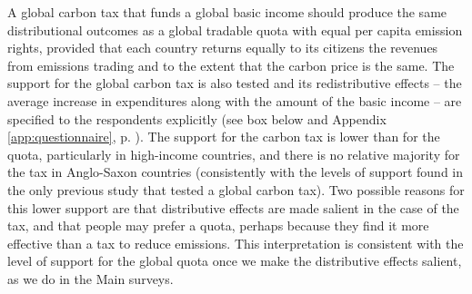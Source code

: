 A global carbon tax that funds a global basic income should produce the same distributional outcomes as a global tradable quota with equal per capita emission rights, provided that each country returns equally to its citizens the revenues from emissions trading and to the extent that the carbon price is the same. %
The support for the global carbon tax is also tested and its redistributive effects --  the average increase in expenditures along with the amount of the basic income -- are specified to the respondents explicitly  (see box below and Appendix \ref{app:questionnaire}, p. \pageref{subsec:questionnaire_GCS}). %
The support for the carbon tax is lower than for the quota, particularly in high-income countries, and there is no relative majority for the tax in Anglo-Saxon countries (consistently with the levels of support found in the only previous study that tested a global carbon tax\cite{carattini_how_2019}). %
Two possible reasons for this lower support are that distributive effects are made salient in the case of the tax, and that people may prefer a quota, perhaps because they find it more effective than a tax to reduce emissions. This interpretation is consistent with the level of support for the global quota once we make the distributive effects salient, as we do in the Main surveys.


